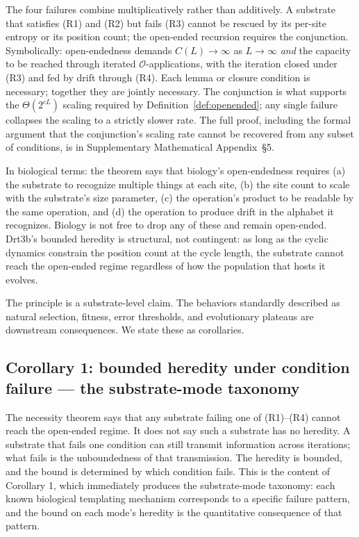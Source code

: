\documentclass[aps,prx,reprint,amsmath,amssymb,floatfix,superscriptaddress,nofootinbib]{revtex4-2}
\theoremstyle{plain-thm}
\theoremstyle{definition-thm}
\newcommand{\Op}{\mathcal{O}}
\begin{document}
The four failures combine multiplicatively rather than additively. A substrate that satisfies (R1) and (R2) but fails (R3) cannot be rescued by its per-site entropy or its position count; the open-ended recursion requires the conjunction. Symbolically: open-endedness demands $C(L) \to \infty$ as $L \to \infty$ \emph{and} the capacity to be reached through iterated $\Op$-applications, with the iteration closed under (R3) and fed by drift through (R4). Each lemma or closure condition is necessary; together they are jointly necessary. The conjunction is what supports the $\Theta(2^{cL})$ scaling required by Definition~\ref{def:openended}; any single failure collapses the scaling to a strictly slower rate. The full proof, including the formal argument that the conjunction's scaling rate cannot be recovered from any subset of conditions, is in Supplementary Mathematical Appendix~\S5.

In biological terms: the theorem says that biology's open-endedness requires (a) the substrate to recognize multiple things at each site, (b) the site count to scale with the substrate's size parameter, (c) the operation's product to be readable by the same operation, and (d) the operation to produce drift in the alphabet it recognizes. Biology is not free to drop any of these and remain open-ended. Drt3b's bounded heredity is structural, not contingent: as long as the cyclic dynamics constrain the position count at the cycle length, the substrate cannot reach the open-ended regime regardless of how the population that hosts it evolves.

The principle is a substrate-level claim. The behaviors standardly described as natural selection, fitness, error thresholds, and evolutionary plateaus are downstream consequences. We state these as corollaries.

\subsection{Corollary 1: bounded heredity under condition failure --- the substrate-mode taxonomy}

The necessity theorem says that any substrate failing one of (R1)--(R4) cannot reach the open-ended regime. It does not say such a substrate has no heredity. A substrate that fails one condition can still transmit information across iterations; what fails is the unboundedness of that transmission. The heredity is bounded, and the bound is determined by which condition fails. This is the content of Corollary 1, which immediately produces the substrate-mode taxonomy: each known biological templating mechanism corresponds to a specific failure pattern, and the bound on each mode's heredity is the quantitative consequence of that pattern.
\end{document}

